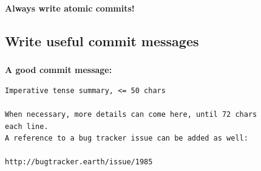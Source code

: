 {
\begin{frame}[plain]

  \begin{center}
    \vspace*{.7\textheight}
    \textbf{\Huge{\color{White}Always write atomic commits!}}
  \end{center}
\end{frame}
}


\subsection{Write useful commit messages}

\begin{frame}
  \begin{center}
    \Huge{\textbf{\insertsubsection}}
  \end{center}
\end{frame}


\begin{frame}[fragile]
  \frametitle{\insertsubsection}

  \textbf{A good commit message:}\\
  \begin{footnotesize}
\begin{verbatim}
Imperative tense summary, <= 50 chars

When necessary, more details can come here, until 72 chars
each line.
A reference to a bug tracker issue can be added as well:

http://bugtracker.earth/issue/1985
\end{verbatim}
  \end{footnotesize}

\end{frame}

